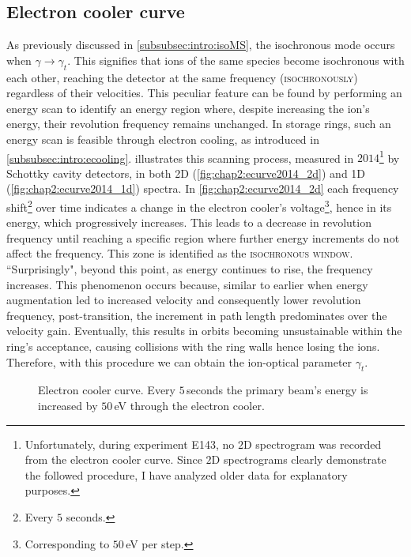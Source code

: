 \subsection{Electron cooler curve}\label{subsec:chap2:ecoolercurve}
As previously discussed in \cref{subsubsec:intro:isoMS}, the isochronous mode occurs when $\gamma \rightarrow \gamma_t$. This signifies that ions of the same species become isochronous with each other, reaching the detector at the same frequency (\textsc{isochronously}) regardless of their velocities. This peculiar feature can be found by performing an energy scan to identify an energy region where, despite increasing the ion's energy, their revolution frequency remains unchanged. 
\newpar
In storage rings, such an energy scan is feasible through electron cooling, as introduced in \cref{subsubsec:intro:ecooling}.  illustrates this scanning process, measured in $2014$\footnote{Unfortunately, during experiment \textsc{E143}, no $2$D spectrogram was recorded from the electron cooler curve. Since $2$D spectrograms clearly demonstrate the followed procedure, I have analyzed older data for explanatory purposes.} by Schottky cavity detectors, in both 2D (\cref{fig:chap2:ecurve2014_2d}) and 1D (\cref{fig:chap2:ecurve2014_1d}) spectra. In \cref{fig:chap2:ecurve2014_2d} each frequency shift\footnote{Every $5$ seconds.} over time indicates a change in the electron cooler's voltage\footnote{Corresponding to $50$\,eV per step.}, hence in its energy, which progressively increases. This leads to a decrease in revolution frequency until reaching a specific region where further energy increments do not affect the frequency. This zone is identified as the \textsc{isochronous window}. ``Surprisingly", beyond this point, as energy continues to rise, the frequency increases. This phenomenon occurs because, similar to earlier when energy augmentation led to increased velocity and consequently lower revolution frequency, post-transition, the increment in path length predominates over the velocity gain. Eventually, this results in orbits becoming unsustainable within the ring's acceptance, causing collisions with the ring walls hence losing the ions. Therefore, with this procedure we can obtain the ion-optical parameter $\gamma_t$. 
\begin{figure}[hbt]
    \centering
    \hspace{0.1cm}
    \caption{Electron cooler curve. Every $5$\,seconds the primary beam's energy is increased by $50$\,eV through the electron cooler.}
    \label{fig:chap2:ecurve2014}
  \end{figure}
